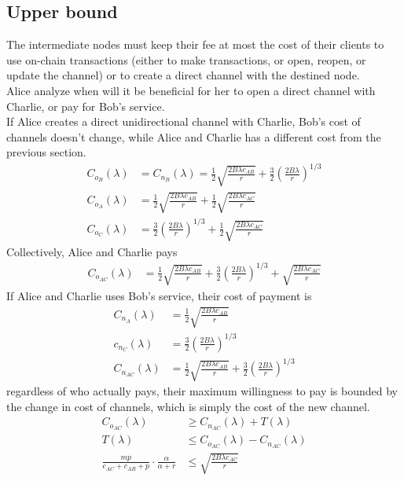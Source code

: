 \documentclass[12pt]{article}
\theoremstyle{plain}
\theoremstyle{remark}
\theoremstyle{definition}
\renewcommand{\geq}{\geqslant}
\renewcommand{\leq}{\leqslant}
\renewcommand{\geq}{\geqslant}
\renewcommand{\leq}{\leqslant}
\begin{document}
\subsection{Upper bound}
The intermediate nodes must keep their fee at most the cost of their clients to use on-chain transactions (either to make transactions, or open, reopen, or update the channel) or to create a direct channel with the destined node. 
\\ Alice analyze when will it be beneficial for her to open a direct channel with Charlie, or pay for Bob's service. 
\\ If Alice creates a direct unidirectional channel with Charlie, Bob's cost of channels doesn't change, while Alice and Charlie has a different cost from the previous section. 
\begin{align}
  C_{o_B}(\lambda)&=C_{n_B}(\lambda)=\frac{1}{2}\sqrt{\frac{2B\lambda c_{AB}}{r}} + \frac{3}{2}(\frac{2B\lambda}{r})^{1/3}\\
  C_{o_A}(\lambda)&=\frac{1}{2}\sqrt{\frac{2B\lambda c_{AB}}{r}}+\frac{1}{2}\sqrt{\frac{2B\lambda c_{AC}}{r}}\\
  C_{o_C}(\lambda) &= \frac{3}{2}(\frac{2B\lambda}{r})^{1/3}+\frac{1}{2}\sqrt{\frac{2B\lambda c_{AC}}{r}}
\end{align}
Collectively, Alice and Charlie pays 
\begin{align}
  C_{o_{AC}}(\lambda) & = \frac{1}{2}\sqrt{\frac{2B\lambda c_{AB}}{r}}+ \frac{3}{2}(\frac{2B\lambda}{r})^{1/3}+\sqrt{\frac{2B\lambda c_{AC}}{r}}
\end{align}
If Alice and Charlie uses Bob's service, their cost of payment is 
\begin{align}
  C_{n_A}(\lambda)&=\frac{1}{2}\sqrt{\frac{2B\lambda c_{AB}}{r}}\\
  c_{n_C}(\lambda) & =\frac{3}{2}(\frac{2B\lambda}{r})^{1/3} \\
  C_{n_{AC}}(\lambda)&=\frac{1}{2}\sqrt{\frac{2B\lambda c_{AB}}{r}}+\frac{3}{2}(\frac{2B\lambda}{r})^{1/3} 
\end{align}
regardless of who actually pays, their maximum willingness to pay is bounded by the change in cost of channels, which is simply the cost of the new channel. 
\begin{align}
  C_{o_{AC}}(\lambda) &\geq C_{n_{AC}}(\lambda) + T(\lambda)\\
  T(\lambda) &\leq C_{o_{AC}}(\lambda) - C_{n_{AC}}(\lambda)\\
  \frac{mp}{c_{AC}+c_{AB}+p} \cdot \frac{\alpha}{\alpha + r} &\leq  \sqrt{\frac{2B\lambda c_{AC}}{r}}
\end{align}
\end{document}

